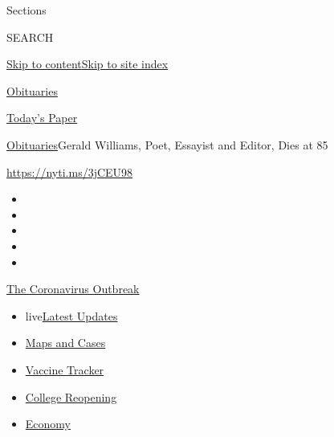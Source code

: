 Sections

SEARCH

\protect\hyperlink{site-content}{Skip to
content}\protect\hyperlink{site-index}{Skip to site index}

\href{https://www.nytimes3xbfgragh.onion/section/obituaries}{Obituaries}

\href{https://myaccount.nytimes3xbfgragh.onion/auth/login?response_type=cookie\&client_id=vi}{}

\href{https://www.nytimes3xbfgragh.onion/section/todayspaper}{Today's
Paper}

\href{/section/obituaries}{Obituaries}\textbar{}Gerald Williams, Poet,
Essayist and Editor, Dies at 85

\url{https://nyti.ms/3jCEU98}

\begin{itemize}
\item
\item
\item
\item
\item
\end{itemize}

\href{https://www.nytimes3xbfgragh.onion/news-event/coronavirus?action=click\&pgtype=Article\&state=default\&region=TOP_BANNER\&context=storylines_menu}{The
Coronavirus Outbreak}

\begin{itemize}
\tightlist
\item
  live\href{https://www.nytimes3xbfgragh.onion/2020/08/04/world/coronavirus-covid-19.html?action=click\&pgtype=Article\&state=default\&region=TOP_BANNER\&context=storylines_menu}{Latest
  Updates}
\item
  \href{https://www.nytimes3xbfgragh.onion/interactive/2020/us/coronavirus-us-cases.html?action=click\&pgtype=Article\&state=default\&region=TOP_BANNER\&context=storylines_menu}{Maps
  and Cases}
\item
  \href{https://www.nytimes3xbfgragh.onion/interactive/2020/science/coronavirus-vaccine-tracker.html?action=click\&pgtype=Article\&state=default\&region=TOP_BANNER\&context=storylines_menu}{Vaccine
  Tracker}
\item
  \href{https://www.nytimes3xbfgragh.onion/2020/08/02/us/covid-college-reopening.html?action=click\&pgtype=Article\&state=default\&region=TOP_BANNER\&context=storylines_menu}{College
  Reopening}
\item
  \href{https://www.nytimes3xbfgragh.onion/live/2020/08/03/business/stock-market-today-coronavirus?action=click\&pgtype=Article\&state=default\&region=TOP_BANNER\&context=storylines_menu}{Economy}
\end{itemize}

